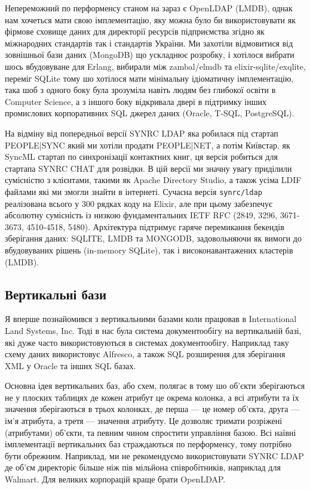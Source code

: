 Непереможний по перформенсу станом на зараз є OpenLDAP (LMDB), однак нам хочеться мати свою імплементацію, яку можна було би використовувати як фірмове сховище даних для директорії ресурсів підприємства згідно як міжнародних стандартів так і стандартів України. Ми захотіли відмовитися від зовнішньої бази даних (MongoDB) що ускладнює розробку, і хотілося вибрати шось вбудовуване для Erlang, вибирали між zambal/elmdb та elixir-sqlite/exqlite, переміг SQLite тому шо хотілося мати мінімальну ідіоматичну імплементацію, така шоб з одного боку була зрозуміла навіть людям без глибокої освіти в Computer Science, а з іншого боку відкривала двері в підтримку інших промислових корпоративних SQL джерел даних (Oracle, T-SQL, PostgreSQL).

На відміну від попередньої версії SYNRC LDAP яка робилася під стартап PEOPLE|SYNC який ми хотіли продати PEOPLE|NET, а потім Київстар, як SyncML стартап по синхронізації контактних книг, ця версія робиться для стартапа SYNRC CHAT для розвідки. В цій версії ми значну увагу приділили сумісністю з клієнтами, такими як Apache Directory Studio, а також усіма LDIF файлами які ми змогли знайти в інтернеті. Сучасна версія \texttt{synrc/ldap} реалізована всього у 300 рядках коду на Elixir, але при цьому забезпечує абсолютну сумісність із низкою фундаментальних IETF RFC (2849, 3296, 3671-3673, 4510-4518, 5480). Архітектура підтримує гаряче перемикання бекендів зберігання даних: SQLITE, LMDB та MONGODB, задовольняючи як вимоги до вбудовуваних рішень (in-memory SQLite), так і високонавантажених кластерів (LMDB).


\subsection{Вертикальні бази}

Я вперше познайомився з вертикальними базами коли працював в International Land Systems, Inc. Тоді в нас була система документообігу на вертикальній базі, які дуже часто використовуються в системах документообігу. Наприклад таку схему даних використовує Alfresco, а також SQL розширення для зберігання XML у Oracle та інших SQL базах.

Основна ідея вертикальних баз, або схем, полягає в тому шо об'єкти зберігаються не у плоских таблицях де кожен атрибут це окрема колонка, а всі атрибути та їх значення зберігаються в трьох колонках, де перша — це номер об'єкта, друга — ім'я атрибута, а третя — значення атрибуту. Це дозволяє тримати розріжені (атрибутами) об'єкти, та певним чином спростити управління базою. Всі наївні імплементації вертикальних баз страждаються по перформенсу, тому потрібно бути обрежним. Наприклад, ми не рекомендуємо використовувати SYNRC LDAP де об'єм директоріє більше ніж пів мільйона співробітників, наприклад для Walmart. Для великих корпорацій краще брати OpenLDAP.

